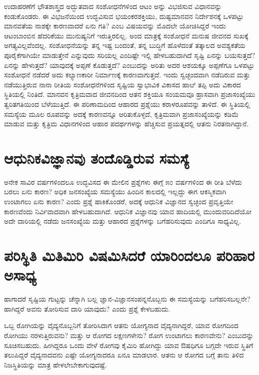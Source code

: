 ಉದಾಹರಣೆಗೆ ಭೌತಶಾಸ್ತ್ರದ ಅದ್ಭುತವಾದ ಸಂಶೋಧನೆಗಳಿಂದ ಆಟಂ ಅನ್ನು ವಿಭಜಿಸುವ ವಿಧಾನವನ್ನು ಕಂಡುಕೊಂಡರು. ಈ ವಿಭಜನೆಯಿಂದ ಉದ್ಭವಿಸುವ ಭಯಂಕರಶಕ್ತಿಯು, ದುಷ್ಟಮಾನವನ ನಿರ್ದೇಶನಕ್ಕೆ ಒಳಪಟ್ಟು ಮಾನವತೆಯ ನಾಶಕ್ಕೇ ಕಾರಣವಾದರೆ ಏನು ಗತಿ? ಎಂಬ ವಿಷಯವನ್ನು ಮೊದಲೇ ಯೋಚಿಸಿದ್ದರೆ ಇಂದು ಆಟಂಬಾಂಬಿನ ಹೆದರಿಕೆಯು ಮುನುಷ್ಯನಿಗೆ ಇರುತ್ತಿರಲಿಲ್ಲ. ಅಂದ ಮಾತ್ರಕ್ಕೆ ಸಂಶೋಧನೆ ಮನುಷ ಜೀವನದ ಸುಖಕ್ಕೆ ಅಗತ್ಯವಿಲ್ಲವೆಂದಲ್ಲ. ಸಂಶೋಧನೆಯನ್ನು ತನ್ನ ಇಷ್ಟ ಬಂದಂತೆ, ತನ್ನ ಬುದ್ಧಿಗೆ ಹೊಳೆದಂತೆ ತತ್ಕಾಲದ ಅವಶ್ಯಕತೆಯ ಪೂರೈಕೆಗಾಗಿಯೇ ಮಾಡುತ್ತೇನೆ ಎನ್ನುವುದು ಸರಿಯಲ್ಲ ಎಂದಿಷ್ಟೇ ಇಲ್ಲಿ ಹೇಳಬಹುದಾಗಿದೆ ಸೃಷ್ಟಿ ಏನನ್ನು ಬಯಸುತ್ತದೆ? ಏನನ್ನು ಹೇಳುತ್ತದೆ? ಯಾವುದಕ್ಕೆ ಅಪ್ಪಣೆ ಕೊಡುತ್ತದೆ? ಎಂಬುದನ್ನು ಅರಿತು ಅದರ ಆಶಯಕ್ಕೂ ಅಪ್ಪ‌ಣೆಗೂ ಒಳಪಟ್ಟು ಸಂಶೋಧನೆ ನಡೆದರೆ ಅದು ಕಲ್ಯಾಣಕಾರೀ ನಿರ್ಮಾಣಕ್ಕೆ ಕಾರಣವಾಗುತ್ತದೆ. ಇಂದು ಸ್ವಚ್ಛಂದವಾಗಿ ನಡೆದಿರುವ ಮತ್ತು ನಡೆಯುತ್ತಿರುವ ನಾನಾ‌ ರೀತಿಯ ಸಂಶೋಧನೆಗಳಿಂದ ಸೃಷ್ಟಿಯ ಸ್ವಾಭಾವಿಕ ವಿಕಾಸದ ಹಾೞಿ ತಪ್ಪಿ ಅದು ವಿಕಾರದ ಸ್ಥಿತಿಯಲ್ಲಿ ನಿಂತಿದೆ. ಮಾನವನ ಕೃತ್ರಿಮವಾದ ಜೀವನದಿಂದ ಆತನ ಶಕ್ತಿಯೂ ಸಂಯಮವೂ ಹ್ರಾಸವಾಗಿ ಪ್ರಜಾಸಂಖ್ಯೆಯು ತ್ವರಿತಗತಿಯಿಂದ ಬೆಳೆಯುತ್ತಿದೆ. ಈ ಪರಿಣಾಮದಿಂದ ಆಹಾರದ ಪ್ರಶ್ನೆಯು ಕರಾಳರೂಪವನ್ನು ತಾಳಿದೆ. ಈ ಸ್ಥಿತಿಯಲ್ಲಿ ಸಮಸ್ಯೆಯ ಮೂಲ ರೂಪವನ್ನು ಅದಕ್ಕೆ ಕಾರಣವನ್ನೂ ಆರಿತುಕೊಳ್ಳದೆ, ಕೃತ್ರಿಮವಾಗಿ ಪ್ರಜಾಸಂಖ್ಯೆಯನ್ನು ಕಡಿಮೆ ಮಾಡುವ ಮತ್ತು ಕೃತ್ರಿಮ ವಿಧಾನಗಳಿಂದ ಆಹಾರ ಪದರ್ಥಗಳನ್ನು ಹೆಚ್ಚಿಸುವ ಪ್ರಯತ್ನದಲ್ಲಿ ಆತನು ನಿರತನಾಗಿದ್ದಾನೆ. 

\section*{ಆಧುನಿಕವಿಜ್ಞಾನವು ತಂದೊಡ್ಡಿರುವ ಸಮಸ್ಯೆ}

ಅನೇಕ ಸಾವಿರ ವರ್ಷಗಳಿಂದಲೂ ಉದ್ಭವಿಸದ ಈ ಮೇಲಿನ ಪ್ರಶ್ನೆಗಳು ಈಗ್ಗೆ ೫೦ ವರ್ಷಗಳಿಂದ ಈ ರೀತಿ ಬೆಳೆದು ಬರಲು ಏನು ಕಾರಣ? ಅಧಿಕ ಜನಸಂಖ್ಯೆಯ ಸಮಸ್ಯೆಯು ಹಿಂದಿನ ಕಾಲದಲ್ಲಿ ಇಲ್ಲದ್ದು ಈಗ ಆಕಸ್ಮಿಕವಾಗಿ ಉಂಟಾಗಲು ಏನು ಕಾರಣ? ಎಂದು ಪ್ರಶ್ನೆ ಹಾಕಿಕೊಂಡರೆ, ಅದಕ್ಕೆ ಆಧುನಿಕ ವಿಜ್ಞಾನದ ಸ್ವಚ್ಛಂದ ಪ್ರವೃತ್ತಿಯೇ ಕಾರಣವೆಂದು ನಿರ್ವಿವಾದವಾಗಿ ಹೇಳಬಹುದಾಗಿದೆ. ಆಧುನಿಕ ವಿಜ್ಞಾನವು ಯಾವ ಹಾದಿಯಲ್ಲಿ ಮುಂದುವರಿದಿದೆಯೋ ಅದೇ ದಾರಿಯಲ್ಲಿ ನಡೆದು ಜನಸಂಖ್ಯೆಯ ಮತ್ತು ಆಹಾರದ ಪ್ರಶ್ನೆಗಳನ್ನು ಬಗೆಹರಿಸುವುದು ಎಂದಿಗೂ ಸಾಧ್ಯವಿಲ್ಲ. 

\section*{ಪರಿಸ್ಥಿತಿ ಮಿತಿಮಿರಿ ವಿಷಮಿಸಿದರೆ ಯಾರಿಂದಲೂ ಪರಿಹಾರ ಅಸಾಧ್ಯ}

ಹಾಗಾದರೆ ಸೃಷ್ಟಿಯ ಗುಟ್ಟನ್ನು ಚೆನ್ನಾಗಿ ಬಲ್ಲ ಜ್ಞಾನ-ವಿಜ್ಞಾನಸಂಪನ್ನನೊಬ್ಬನು ಈ ಸಮಸ್ಯೆಯನ್ನು ಬಗೆಹರಿಸಬಲ್ಲನೇ? ಹಾಗಿದ್ದರೆ ಅವನು ತೋರಿಸುವ ದಾರಿ ಯಾವುದು? ಎಂದು ಪ್ರಶ್ನೆ ಕೇಳಬಹುದು.

ಒಬ್ಬ ರೋಗಿಯನ್ನು ವೈದ್ಯನೊಬ್ಬನಿಗೆ ತೋರಿಸಿದಾಗ ಆತನು ಯೋಗ್ಯನಾದ ವೈದ್ಯನಾಗಿದ್ದರೆ, ಯಾವ ರೋಗದಿಂದ ರೋಗಿಯು ನರಳುತ್ತಿರುವನು? ಮತ್ತು ಆ ರೋಗದ ಲಕ್ಷಣಗಳೇನು? ರೋಗ ಉಂಟಾಗಲು ಕಾರಣವೇನು? ಎಂಬುದನ್ನು ಸೂಚಿಸಬಹುದು. ಹೀಗಿದ್ದರೂ ಒಂದು ವೇಳೆ ರೋಗವು ಕೈಮಿರಿ ಹೋಗಿದ್ದು ಯಾವ ಔಷಧಿಗೂ ಬಗ್ಗದೇ ಇರುವ ಸ್ಥಿತಿಗೆ ತಲುಪಿದ್ದರೆ ವೈದ್ಯನಾದವನು ಎಷ್ಟೇ ಯೋಗ್ಯನಾದರೂ ಏನೂ ಮಾಡಲಾರ. ಆತನು ಆ ರೋಗದ ಬಗ್ಗೆ ತಾನು ತಿಳಿದ ನಿಜಸ್ಥಿತಿಯನ್ನು ಮಾತ್ರ ಹೇಳಲೇಬೇಕಾಗುವುದಷ್ಟೆ.

